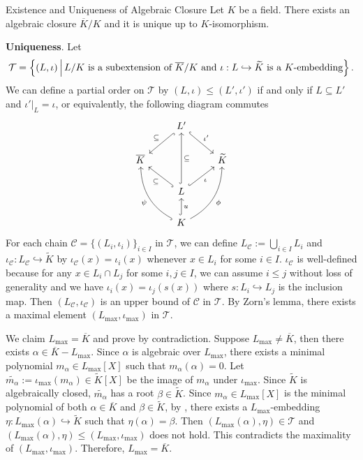 \begin{proposition}{Existence and Uniqueness of Algebraic Closure}{}
    Let $K$ be a field. There exists an algebraic closure $\overline{K}/K$ and it is unique up to $K$-isomorphism.
\end{proposition}
\begin{prf}
    \textbf{Uniqueness}. Let 
    \[
    \mathcal{T}=\left\{(L,\iota)\,\middle\vert\, L/K \text{ is a subextension of } \overline{K}/K \text{ and } \iota:L\hookrightarrow \widetilde{K}  \text{ is a $K$-embedding}\right\}.
    \]
    We can define a partial order on $\mathcal{T}$ by $(L,\iota)\le (L',\iota')$ if and only if $L\subseteq L'$ and $\iota'|_{L}=\iota$, or equivalently, the following diagram commutes
    \[
        \begin{tikzcd}
            & L' \arrow[ld, "\subseteq"', hook] \arrow[rd, "\iota'", hook]                                   &               \\
\overline{K} &                                                                                               & \widetilde{K} \\
            & L \arrow[uu,  "\subseteq"', hook] \arrow[lu, "\subseteq", hook] \arrow[ru, "\iota"', hook]    &               \\
            & K \arrow[u, "u"', hook] \arrow[luu, "\psi", hook, bend left] \arrow[ruu, "\phi"', bend right] &              
\end{tikzcd}
\]
For each chain $\mathcal{C}=\{(L_i,\iota_i)\}_{i\in I}$ in $\mathcal{T}$, we can define $L_{\mathcal{C}}:=\bigcup_{i\in I}L_i$ and $\iota_{\mathcal{C}}:L_{\mathcal{C}}\hookrightarrow \widetilde{K}$ by $\iota_{\mathcal{C}}(x)=\iota_i(x)$ whenever $x\in L_i$ for some $i\in I$. $\iota_{\mathcal{C}}$ is well-defined because for any $x\in L_i\cap L_j$ for some $i,j\in I$, we can assume $i\le j$ without loss of generality and we have $\iota_i(x)=\iota_j(s(x))$ where $s:L_i\hookrightarrow L_j$ is the inclusion map. Then $(L_{\mathcal{C}},\iota_{\mathcal{C}})$ is an upper bound of $\mathcal{C}$ in $\mathcal{T}$. By Zorn's lemma, there exists a maximal element $(L_{\max},\iota_{\max})$ in $\mathcal{T}$. 

We claim $L_{\max}=\overline{K}$ and prove by contradiction. Suppose $L_{\max}\ne \overline{K}$, then there exists $\alpha\in \overline{K}- L_{\max}$. Since $\alpha$ is algebraic over $L_{\max}$, there exists a minimal polynomial $m_\alpha\in L_{\max}[X]$ such that $m_\alpha(\alpha)=0$. Let $\widetilde{m_\alpha}:={\iota_{\max}}(m_\alpha)\in \widetilde{K}[X]$ be the image of $m_\alpha$ under $\iota_{\max}$. Since $\widetilde{K}$ is algebraically closed, $\widetilde{m_\alpha}$ has a root $\beta\in \widetilde{K}$. Since $m_\alpha\in L_{\max}[X]$ is the minimal polynomial of both $\alpha\in \overline{K}$ and $\beta\in \widetilde{K}$, by , there exists a $L_{\max}$-embedding $\eta:L_{\max}(\alpha)\hookrightarrow \widetilde{K}$ such that $\eta(\alpha)=\beta$. Then $(L_{\max}(\alpha),\eta)\in \mathcal{T}$ and $(L_{\max}(\alpha),\eta)\le (L_{\max},\iota_{\max})$ does not hold. This contradicts the maximality of $(L_{\max},\iota_{\max})$. Therefore, $L_{\max}=\overline{K}$.


\end{prf}
